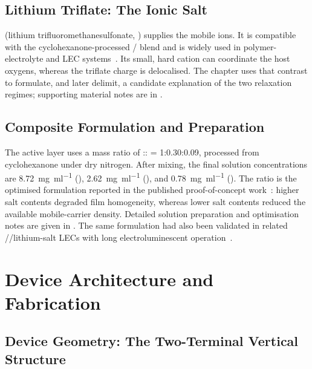 \documentclass[12pt, twoside]{report}
\begin{document}
\subsection{Lithium Triflate: The Ionic Salt}\label{subsec:litf}

\LiTf{} (lithium trifluoromethanesulfonate, ) supplies the mobile ions. It is compatible with the cyclohexanone-processed \SY{}/\Hybrane{} blend and is widely used in polymer-electrolyte and LEC systems~\cite{Pei1995,Wagberg2008}. Its small, hard  cation can coordinate the host oxygens, whereas the triflate charge is delocalised. The chapter uses that contrast to formulate, and later delimit, a candidate explanation of the two relaxation regimes; supporting material notes are in .

\subsection{Composite Formulation and Preparation}\label{subsec:formulation}

The active layer uses a mass ratio of \SY{}:\Hybrane{}:\LiTf{} = 1:0.30:0.09, processed from cyclohexanone under dry nitrogen. After mixing, the final solution concentrations are \SI{8.72}{\milli\gram\per\milli\litre} (\SY{}), \SI{2.62}{\milli\gram\per\milli\litre} (\Hybrane{}), and \SI{0.78}{\milli\gram\per\milli\litre} (\LiTf{}). The ratio is the optimised formulation reported in the published proof-of-concept work~\cite{PradoSocorro2022}: higher salt contents degraded film homogeneity, whereas lower salt contents reduced the available mobile-carrier density. Detailed solution preparation and optimisation notes are given in . The same formulation had also been validated in related \SY{}/\Hybrane{}/lithium-salt LECs with long electroluminescent operation~\cite{Mardegan2021}.


\section{Device Architecture and Fabrication}\label{sec:device_fab}

\subsection{Device Geometry: The Two-Terminal Vertical Structure}\label{subsec:device_geometry}
\end{document}
